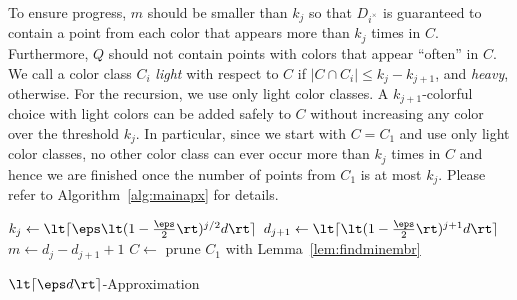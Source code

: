 To ensure progress, $m$ should be smaller than $k_j$ so that 
$D_{i^\times}$ is guaranteed to contain a point from each 
color that appears more than $k_j$ times
in $C$. Furthermore, $Q$ should not contain points with colors that appear
``often'' in $C$. We call a color class $C_i$ \emph{light} with 
respect to $C$ if $|C \cap C_i| \leq k_j - k_{j+1}$, and 
\emph{heavy}, otherwise. For the recursion, we use only light 
color classes. A $k_{j+1}$-colorful choice with light colors can be 
added safely to $C$ without increasing any color over the
threshold $k_j$. In particular, since we start with $C=C_1$ and 
use only light color classes, no other color class can ever occur 
more than $k_j$ times in $C$ and hence we are finished once the 
number of points from $C_1$ is at most $k_j$.
Please refer to Algorithm~\ref{alg:mainapx} for details.

\begin{alg}
  $k_j \gets \lt\lceil \eps \lt(1-\frac{\eps}{2}\rt)^{j/2} d \rt\rceil$\;
  $d_{j+1} \gets \lt\lceil \lt(1-\frac{\eps}{2}\rt)^{j+1} d \rt\rceil$\;
  $m \gets d_j - d_{j+1} + 1$\;
  $C \gets $ prune $C_1$ with
  Lemma~\ref{lem:findminembr}\;\label{alg:mainapx:initprune}
  \;\label{alg:mainapx:return}
  \caption[Computing $\0$-embracing $\lt\lceil \eps d\rt\rceil$-colorful
  choices.]{$\lt\lceil \eps d\rt\rceil$-Approximation}
  \label{alg:mainapx}
\end{alg}

